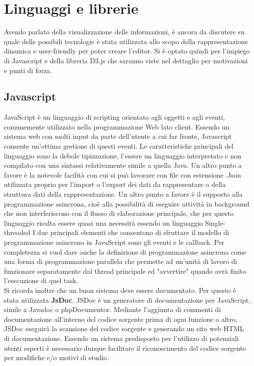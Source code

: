 {\section{Linguaggi e librerie}
Avendo parlato della visualizzazione delle informazioni, è ancora da discutere su quale delle possibili tecnologie è stata utilizzata allo scopo della rappresentazione dinamica e user-friendly per poter creare l'editor.
Si è optato quindi per l'impiego di Javascript e della libreria D3.js che saranno viste nel dettaglio per motivazioni e punti di forza.
\subsection{Javascript}
JavaScript è un linguaggio di scripting orientato agli oggetti e agli eventi, comunemente utilizzato nella programmazione Web lato client. Essendo un sistema web con molti input da parte dell'utente a cui far fronte, Javascript consente un'ottima gestione di questi eventi. Le caratteristiche principali del linguaggio sono la debole tipizzazione, l'essere un linguaggio interpretato e non compilato con una sintassi relativamente simile a quella Java. Un altro punto a favore è la notevole facilità con cui si può lavorare con file con estensione .Json utilizzata proprio per l'import o l'export dei dati da rappresentare o della struttura dati della rappresentazione.
Un altro punto a favore è il supporto alla programmazione asincrona, cioè alla possibilità di eseguire attività in background che non interferiscono con il flusso di elaborazione principale, che per questo linguaggio risulta essere quasi una necessità essendo un linguaggio Single-threaded I due principali elementi che consentono di sfruttare il modello di programmazione asincrono in JavaScript sono gli eventi e le callback. Per completezza si vuol dare anche la definizione di programmazione asincrona come una forma di programmazione parallela che permette ad un’unità di lavoro di funzionare separatamente dal thread principale ed "avvertire" quando avrà finito l'esecuzione di quel task.\\
Si ricorda inoltre che un buon sistema deve essere documentato. Per questo è stata utilizzata \textbf{JsDoc}.
JSDoc è un generatore di documentazione per JavaScript, simile a Javadoc o phpDocumentor. Mediante l'aggiunta di commenti di documentazione all'interno del codice sorgente prima di ogni funzione o altro, JSDoc eseguirà la scansione del codice sorgente e generando un sito web HTML di documentazione. Essendo un sistema predisposto per l'utilizzo di potenziali utenti esperti è necessario dunque facilitare il riconoscimento del codice sorgente per modifiche e/o motivi di studio.
}
